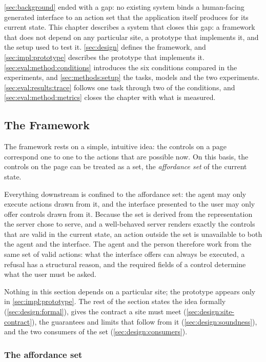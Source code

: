 \autoref{sec:background} ended with a gap: no existing system binds a human-facing generated interface to an action set that the application itself produces for its current state.
This chapter describes a system that closes this gap: a framework that does not depend on any particular site, a prototype that implements it, and the setup used to test it.
\autoref{sec:design} defines the framework, and \autoref{sec:impl:prototype} describes the prototype that implements it.
\autoref{sec:eval:method:conditions} introduces the six conditions compared in the experiments, and \autoref{sec:methods:setup} the tasks, models and the two experiments.
\autoref{sec:eval:results:trace} follows one task through two of the conditions, and \autoref{sec:eval:method:metrics} closes the chapter with what is measured.

\subsection{The Framework}\label{sec:design}

The framework rests on a simple, intuitive idea: the controls on a page correspond one to one to the actions that are possible now.
On this basis, the controls on the page can be treated as a set, the \emph{affordance set} of the current state.

Everything downstream is confined to the affordance set: the agent may only execute actions drawn from it, and the interface presented to the user may only offer controls drawn from it.
Because the set is derived from the representation the server chose to serve, and a well-behaved server renders exactly the controls that are valid in the current state, an action outside the set is unavailable to both the agent and the interface.
The agent and the person therefore work from the same set of valid actions: what the interface offers can always be executed, a refusal has a structural reason, and the required fields of a control determine what the user must be asked.

Nothing in this section depends on a particular site; the prototype appears only in \autoref{sec:impl:prototype}.
The rest of the section states the idea formally (\autoref{sec:design:formal}), gives the contract a site must meet (\autoref{sec:design:site-contract}), the guarantees and limits that follow from it (\autoref{sec:design:soundness}), and the two consumers of the set (\autoref{sec:design:consumers}).

\subsubsection{The affordance set}\label{sec:design:formal}\label{sec:design:defs}

